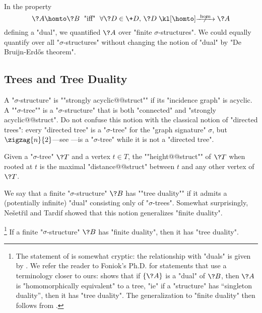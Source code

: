 \begin{remark}
	In the property
	\[
		\?A \homto \?B
		\;\text{ "iff" }\;
		\forall \?D \in \+D,\, \?D \nothomto \?A
	\]
	defining a "dual", we quantified $\?A$ over "finite $\sigma$-structures". 
	We could equally quantify over all "$\sigma$-structures" without changing the notion of "dual" by "De Bruijn-Erdős theorem".
\end{remark}


\subsection{Trees and Tree Duality}

A "$\sigma$-structure" is \AP""strongly acyclic@@struct"" if its "incidence graph" is acyclic.
A \AP""$\sigma$-tree"" is a "$\sigma$-structure" that is both "connected" and "strongly acyclic@@struct".
Do not confuse this notion with the classical notion of "directed trees":
every "directed tree" is a "$\sigma$-tree" for the "graph signature" $\sigma$,
but $\zigzag{n}{2}$---see ---is a "$\sigma$-tree"
while it is not a "directed tree". 

Given a "$\sigma$-tree" $\?T$ and a vertex $t\in T$, the \AP""height@@struct"" of $\?T$
when rooted at $t$ is the maximal "distance@@struct" between $t$ and any other vertex of $\?T$.

We say that a finite "$\sigma$-structure" $\?B$ has \AP""tree duality""
if it admits a (potentially infinite) "dual" consisting only of "$\sigma$-trees".
Somewhat surprisingly, Ne\v{s}et\v{r}il and Tardif showed that
this notion generalizes "finite duality".

\begin{proposition}
	\!\footnote{The statement of \cite[Theorem~3.1]{NesetrilTardif2000DualityTheorems}
	is somewhat cryptic: the relationship with "duals" is given by
	\cite[Lemma~2.5]{NesetrilTardif2000DualityTheorems}.
	We refer the reader to Foniok's Ph.D. for statements that use a terminology closer to ours:
	\cite[Theorem~2.1.12]{Foniok2007PhD} shows that if $\{\?A\}$ is a "dual" of $\?B$,
	then $\?A$ is "homomorphically equivalent" to a tree, "ie" if a "structure" has
	``singleton duality'', then it has "tree duality".
	The generalization to "finite duality" then follows from
	\cite[Theorem~2.4.4]{Foniok2007PhD}.}
	\AP\label{prop:finite-duality-implies-tree-duality}
	If a finite "$\sigma$-structure" $\?B$ has "finite duality",
	then it has "tree duality".
\end{proposition}

